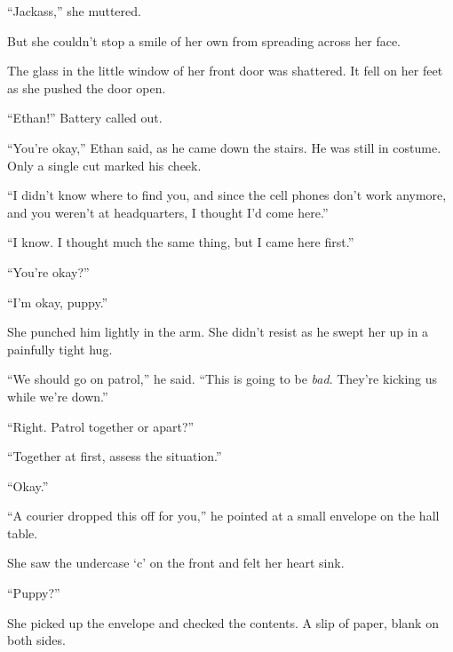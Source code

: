 ``Jackass,'' she muttered.



But she couldn't stop a smile of her own from spreading across her face.



\sectionbreak



The glass in the little window of her front door was shattered.  It fell on her feet as she pushed the door open.



``Ethan!''  Battery called out.



``You're okay,'' Ethan said, as he came down the stairs.  He was still in costume.  Only a single cut marked his cheek.



``I didn't know where to find you, and since the cell phones don't work anymore, and you weren't at headquarters, I thought I'd come here.''



``I know.  I thought much the same thing, but I came here first.''



``You're okay?''



``I'm okay, puppy.''



She punched him lightly in the arm.  She didn't resist as he swept her up in a painfully tight hug.



``We should go on patrol,'' he said.  ``This is going to be \emph{bad}.  They're kicking us while we're down.''



``Right.  Patrol together or apart?''



``Together at first, assess the situation.''



``Okay.''



``A courier dropped this off for you,'' he pointed at a small envelope on the hall table.



She saw the undercase `c' on the front and felt her heart sink.



``Puppy?''



She picked up the envelope and checked the contents.  A slip of paper, blank on both sides.



